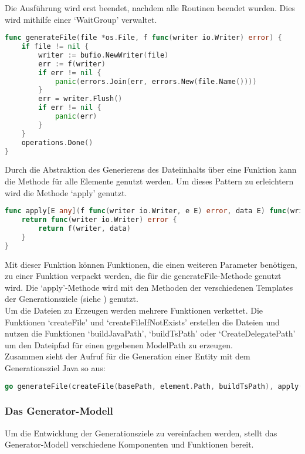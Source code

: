 \documentclass[./einleitung.tex]{subfiles}
\begin{document}
    Die Ausführung wird erst beendet, nachdem alle Routinen beendet wurden.
    Dies wird mithilfe einer `WaitGroup' verwaltet.
    \begin{lstlisting}[language=Go, caption=Die Methode generateFile, label=lst:generateFile]
func generateFile(file *os.File, f func(writer io.Writer) error) {
	if file != nil {
		writer := bufio.NewWriter(file)
		err := f(writer)
		if err != nil {
			panic(errors.Join(err, errors.New(file.Name())))
		}
		err = writer.Flush()
		if err != nil {
			panic(err)
		}
	}
	operations.Done()
}
    \end{lstlisting}
    Durch die Abstraktion des Generierens des Dateiinhalts über eine Funktion kann die Methode für alle Elemente genutzt werden.
    Um dieses Pattern zu erleichtern wird die Methode `apply' genutzt.
    \begin{lstlisting}[language=Go, caption=Die apply-Methode, label=lst:apply]
func apply[E any](f func(writer io.Writer, e E) error, data E) func(writer io.Writer) error {
	return func(writer io.Writer) error {
		return f(writer, data)
	}
}
    \end{lstlisting}
    Mit dieser Funktion können Funktionen, die einen weiteren Parameter benötigen, zu einer Funktion verpackt werden, die für die generateFile-Methode genutzt wird.
    Die `apply'-Methode wird mit den Methoden der verschiedenen Templates der Generationsziele (siehe ) genutzt.\\

    Um die Dateien zu Erzeugen werden mehrere Funktionen verkettet.
    Die Funktionen `createFile' und `createFileIfNotExists' erstellen die Dateien und nutzen die Funktionen `buildJavaPath', `buildTsPath' oder `CreateDelegatePath' um den Dateipfad für einen gegebenen ModelPath zu erzeugen.\\
    Zusammen sieht der Aufruf für die Generation einer Entity mit dem Generationsziel Java so aus:
    \begin{lstlisting}[language=Go, caption=Generation einer Entity, label=lst:generateEntity]
go generateFile(createFile(basePath, element.Path, buildTsPath), apply(template.GenerateEntity, element))
    \end{lstlisting}

    \subsubsection{Das Generator-Modell}\label{subsubsec:generator-modell}
    Um die Entwicklung der Generationsziele zu vereinfachen werden, stellt das Generator-Modell verschiedene Komponenten und Funktionen bereit.
\end{document}

